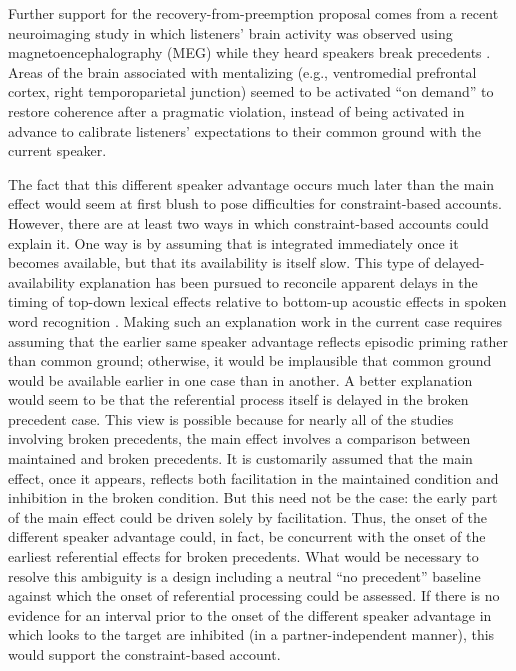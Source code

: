 \documentclass[doc,fignum,apacite,floatsintext]{apa6}
\begin{document}
Further support for the recovery-from-preemption proposal comes from a recent neuroimaging study in which listeners' brain activity was observed using magnetoencephalography (MEG) while they heard speakers break precedents \cite{BogelsEtAl2014}.  Areas of the brain associated with mentalizing (e.g., ventromedial prefrontal cortex, right temporoparietal junction) seemed to be activated ``on demand'' to restore coherence after a pragmatic violation, instead of being activated in advance to calibrate listeners' expectations to their common ground with the current speaker.

The fact that this different speaker advantage occurs much later than the main effect would seem at first blush to pose difficulties for constraint-based accounts.  However, there are at least two ways in which constraint-based accounts could explain it.  One way is by assuming that is integrated immediately once it becomes available, but that its availability is itself slow.  This type of delayed-availability explanation has been pursued to reconcile apparent delays in the timing of top-down lexical effects relative to bottom-up acoustic effects in spoken word recognition \cite{magnusonetal03}.  Making such an explanation work in the current case requires assuming that the earlier same speaker advantage reflects episodic priming rather than common ground; otherwise, it would be implausible that common ground would be available earlier in one case than in another.  A better explanation would seem to be that the referential process itself is delayed in the broken precedent case.  This view is possible because for nearly all of the studies involving broken precedents, the main effect involves a comparison between maintained and broken precedents.  It is customarily assumed that the main effect, once it appears, reflects both facilitation in the maintained condition and inhibition in the broken condition.  But this need not be the case: the early part of the main effect could be driven solely by facilitation.  Thus, the onset of the different speaker advantage could, in fact, be concurrent with the onset of the earliest referential effects for broken precedents.  What would be necessary to resolve this ambiguity is a design including a neutral ``no precedent'' baseline against which the onset of referential processing could be assessed.  If there is no evidence for an interval prior to the onset of the different speaker advantage in which looks to the target are inhibited (in a partner-independent manner), this would support the constraint-based account.
\end{document}
